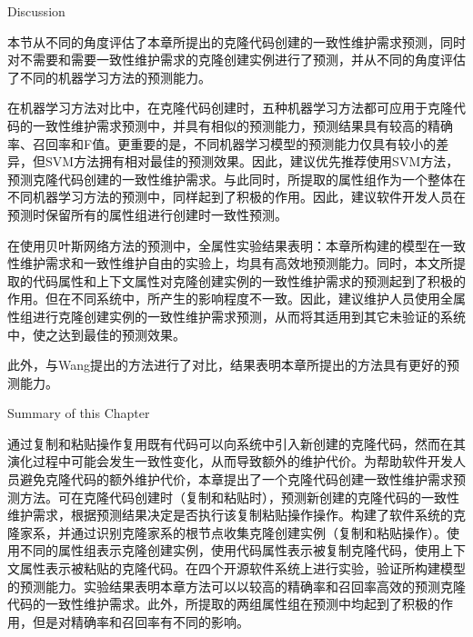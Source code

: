 {Discussion}

本节从不同的角度评估了本章所提出的克隆代码创建的一致性维护需求预测，同时对不需要和需要一致性维护需求的克隆创建实例进行了预测，并从不同的角度评估了不同的机器学习方法的预测能力。

在机器学习方法对比中，在克隆代码创建时，五种机器学习方法都可应用于克隆代码的一致性维护需求预测中，并具有相似的预测能力，预测结果具有较高的精确率、召回率和F值。更重要的是，不同机器学习模型的预测能力仅具有较小的差异，但SVM方法拥有相对最佳的预测效果。因此，建议优先推荐使用SVM方法，预测克隆代码创建的一致性维护需求。与此同时，所提取的属性组作为一个整体在不同机器学习方法的预测中，同样起到了积极的作用。因此，建议软件开发人员在预测时保留所有的属性组进行创建时一致性预测。

在使用贝叶斯网络方法的预测中，全属性实验结果表明：本章所构建的模型在一致性维护需求和一致性维护自由的实验上，均具有高效地预测能力。同时，本文所提取的代码属性和上下文属性对克隆创建实例的一致性维护需求的预测起到了积极的作用。但在不同系统中，所产生的影响程度不一致。因此，建议维护人员使用全属性组进行克隆创建实例的一致性维护需求预测，从而将其适用到其它未验证的系统中，使之达到最佳的预测效果。

此外，与Wang提出的方法进行了对比，结果表明本章所提出的方法具有更好的预测能力。

{Summary of this Chapter}

通过复制和粘贴操作复用既有代码可以向系统中引入新创建的克隆代码，然而在其演化过程中可能会发生一致性变化，从而导致额外的维护代价。为帮助软件开发人员避免克隆代码的额外维护代价，本章提出了一个克隆代码创建一致性维护需求预测方法。可在克隆代码创建时（复制和粘贴时），预测新创建的克隆代码的一致性维护需求，根据预测结果决定是否执行该复制粘贴操作操作。构建了软件系统的克隆家系，并通过识别克隆家系的根节点收集克隆创建实例（复制和粘贴操作）。使用不同的属性组表示克隆创建实例，使用代码属性表示被复制克隆代码，使用上下文属性表示被粘贴的克隆代码。在四个开源软件系统上进行实验，验证所构建模型的预测能力。实验结果表明本章方法可以以较高的精确率和召回率高效的预测克隆代码的一致性维护需求。此外，所提取的两组属性组在预测中均起到了积极的作用，但是对精确率和召回率有不同的影响。

